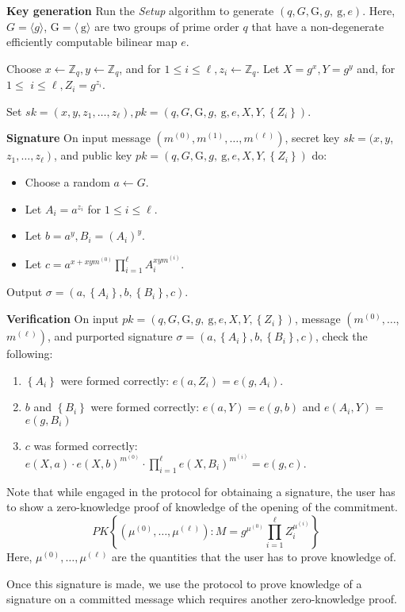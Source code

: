 \textbf{Key generation} Run the \textit{Setup} algorithm to generate $(q, G, \mathrm{G}, g, \mathrm{~g}, e)$. Here, $G = \langle g \rangle$, $\mathrm{G} = \langle \mathrm{~g} \rangle$ are two groups of prime order $q$ that have a non-degenerate efficiently computable bilinear map $e$.

Choose $x \leftarrow \mathbb{Z}_q, y \leftarrow \mathbb{Z}_q$, and for $1 \leq i \leq \ell, z_i \leftarrow \mathbb{Z}_q$. Let $X=g^x, Y=g^y$ and, for $1 \leq$ $i \leq \ell, Z_i=g^{z_i}$. 

Set $s k=\left(x, y, z_1, \ldots, z_{\ell}\right), p k=\left(q, G, \mathrm{G}, g, \mathrm{~g}, e, X, Y,\left\{Z_i\right\}\right)$.

\textbf{Signature} On input message $\left(m^{(0)}, m^{(1)}, \ldots, m^{(\ell)}\right)$, secret key $s k=(x, y$, $\left.z_1, \ldots, z_{\ell}\right)$, and public key $p k=\left(q, G, \mathrm{G}, g, \mathrm{~g}, e, X, Y,\left\{Z_i\right\}\right)$ do:
\begin{itemize}[noitemsep]
\item Choose a random $a \leftarrow G$.
\item Let $A_i=a^{z_i}$ for $1 \leq i \leq \ell$.
\item Let $b=a^y, B_i=\left(A_i\right)^y$.
\item Let $c=a^{x+x y m^{(0)}} \prod_{i=1}^{\ell} A_i^{x y m^{(i)}}$.
\end{itemize}
Output $\sigma=\left(a,\left\{A_i\right\}, b,\left\{B_i\right\}, c\right)$.

\textbf{Verification} On input $p k=\left(q, G, \mathrm{G}, g, \mathrm{~g}, e, X, Y,\left\{Z_i\right\}\right)$, message $\left(m^{(0)}, \ldots\right.$, $\left.m^{(\ell)}\right)$, and purported signature $\sigma=\left(a,\left\{A_i\right\}, b,\left\{B_i\right\}, c\right)$, check the following:
\begin{enumerate}[noitemsep]
    \item $\left\{A_i\right\}$ were formed correctly: $e\left(a, Z_i\right)=e\left(g, A_i\right)$.
    \item $b$ and $\left\{B_i\right\}$ were formed correctly: $e(a, Y)=e(g, b)$ and $e\left(A_i, Y\right)=$ $e\left(g, B_i\right)$
    \item $c$ was formed correctly: $e(X, a) \cdot e(X, b)^{m^{(0)}} \cdot \prod_{i=1}^{\ell} e\left(X, B_i\right)^{m^{(i)}}=e(g, c)$.
\end{enumerate}

Note that while engaged in the protocol for obtainaing a signature, the user has to show a zero-knowledge proof of knowledge of the opening of the commitment. 
\begin{equation}
    P K\left\{\left(\mu^{(0)}, \ldots, \mu^{(\ell)}\right): M=g^{\mu^{(0)}} \prod_{i=1}^{\ell} Z_i^{\mu^{(i)}}\right\}
\end{equation}
Here, $\mu^{(0)}, \ldots, \mu^{(\ell)}$ are the quantities that the user has to prove knowledge of.

Once this signature is made, we use the protocol to prove knowledge of a signature on a committed message which requires another zero-knowledge proof. 


